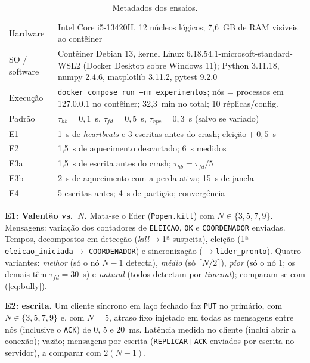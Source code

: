 \documentclass[conference,a4paper]{IEEEtran}
\begin{document}
\begin{table}[!ht]
\caption{Metadados dos ensaios.}
\label{tab:meta}
\centering
\footnotesize
\setlength{\tabcolsep}{3pt}
\begin{tabular}{@{}lp{}@{}}
\toprule
Hardware & Intel Core i5-13420H, 12 núcleos lógicos; 7,6~GB de RAM visíveis ao contêiner \\
SO / software & Contêiner Debian 13, kernel Linux 6.18.54.1-microsoft-standard-WSL2 (Docker Desktop sobre Windows 11); Python 3.11.18, numpy 2.4.6, matplotlib 3.11.2, pytest 9.2.0 \\
Execução & \texttt{docker compose run --rm experimentos}; nós = processos em 127.0.0.1 no contêiner; 32,3~min no total; 10 réplicas/config. \\
Padrão & $\tau_{hb}=0{,}1$~s, $\tau_{fd}=0{,}5$~s, $\tau_{rpc}=0{,}3$~s (salvo se variado) \\
E1 & 1~s de \emph{heartbeats} e 3 escritas antes do crash; eleição${}+0{,}5$~s \\
E2 & 1,5~s de aquecimento descartado; 6~s medidos \\
E3a & 1,5~s de escrita antes do crash; $\tau_{hb}=\tau_{fd}/5$ \\
E3b & 2~s de aquecimento com a perda ativa; 15~s de janela \\
E4 & 5 escritas antes; 4~s de partição; convergência \\
\bottomrule
\end{tabular}
\end{table}

\textbf{E1: Valentão vs.\ $N$.} Mata-se o líder (\texttt{Popen.kill}) com
$N\in\{3,5,7,9\}$. Mensagens: variação dos contadores de \texttt{ELEICAO},
\texttt{OK} e \texttt{COORDENADOR} enviadas. Tempos, decompostos em detecção
(\emph{kill}$\to$1ª suspeita), eleição (1ª \texttt{eleicao\_iniciada}$\to$
\texttt{COORDENADOR}) e sincronização ($\to$\texttt{lider\_pronto}). Quatro
variantes: \emph{melhor} (só o nó $N-1$ detecta), \emph{médio} (só
$\lceil N/2\rceil$), \emph{pior} (só o nó 1; os demais têm $\tau_{fd}=30$~s) e
\emph{natural} (todos detectam por \emph{timeout}); comparam-se com (\ref{eq:bully}).

\textbf{E2: escrita.} Um cliente síncrono em laço fechado faz \texttt{PUT}
no primário, com $N\in\{3,5,7,9\}$ e, com $N=5$, atraso fixo injetado em
todas as mensagens entre nós (inclusive o \texttt{ACK}) de 0, 5 e 20~ms.
Latência medida no cliente (inclui abrir a conexão); vazão; mensagens por
escrita (\texttt{REPLICAR}+\texttt{ACK} enviados por escrita no servidor),
a comparar com $2(N-1)$.
\end{document}
